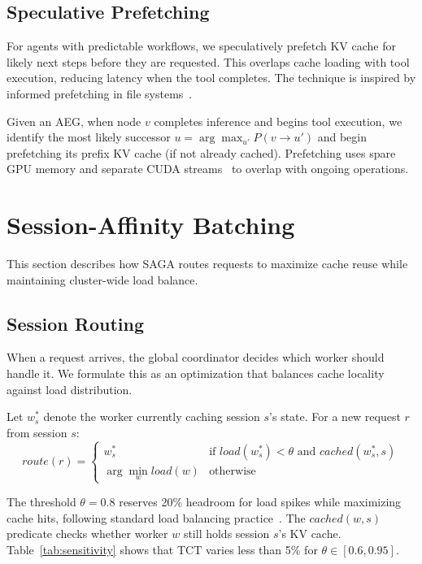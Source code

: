 \documentclass[sigconf]{acmart}
\newcommand{\sysname}{SAGA\xspace}
\begin{document}
\subsection{Speculative Prefetching}
\label{sec:prefetch}

For agents with predictable workflows, we speculatively prefetch KV cache for likely next steps before they are requested. This overlaps cache loading with tool execution, reducing latency when the tool completes. The technique is inspired by informed prefetching in file systems~\cite{patterson1995prefetching,cao1996implementation}.

Given an AEG, when node $v$ completes inference and begins tool execution, we identify the most likely successor $u = \arg\max_{u'} P(v \rightarrow u')$ and begin prefetching its prefix KV cache (if not already cached). Prefetching uses spare GPU memory and separate CUDA streams~\cite{Rennich12-CUDAStreams} to overlap with ongoing operations.

\section{Session-Affinity Batching}
\label{sec:batching}

This section describes how \sysname routes requests to maximize cache reuse while maintaining cluster-wide load balance.

\subsection{Session Routing}
\label{sec:routing}

When a request arrives, the global coordinator decides which worker should handle it. We formulate this as an optimization that balances cache locality against load distribution.

Let $w^*_s$ denote the worker currently caching session $s$'s state. For a new request $r$ from session $s$:
\begin{equation}
    route(r) = \begin{cases}
        w^*_s & \text{if } load(w^*_s) < \theta \text{ and } cached(w^*_s, s) \\
        \arg\min_w load(w) & \text{otherwise}
    \end{cases}
    \label{eq:routing}
\end{equation}

The threshold $\theta = 0.8$ reserves 20\% headroom for load spikes while maximizing cache hits, following standard load balancing practice~\cite{ousterhout2013sparrow}. The $cached(w, s)$ predicate checks whether worker $w$ still holds session $s$'s KV cache. Table~\ref{tab:sensitivity} shows that TCT varies less than 5\% for $\theta \in [0.6, 0.95]$.
\end{document}
